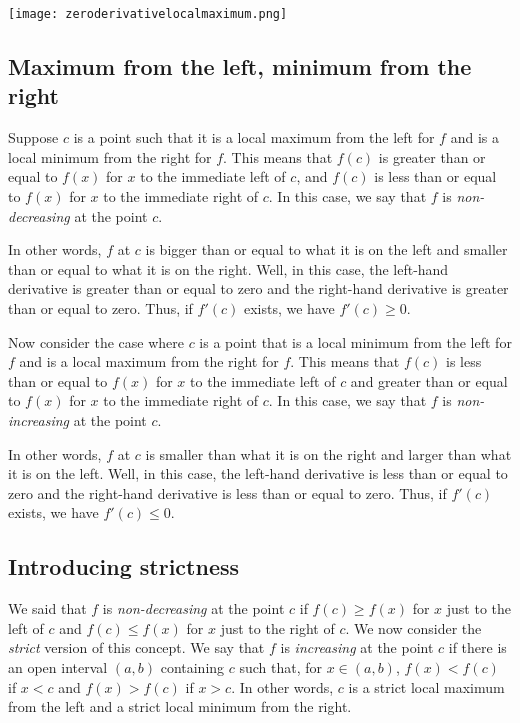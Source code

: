 \documentclass[10pt]{amsart}
\begin{document}
\texttt{[image: zeroderivativelocalmaximum.png]}

\subsection{Maximum from the left, minimum from the right}

Suppose $c$ is a point such that it is a local maximum from the left
for $f$ and is a local minimum from the right for $f$. This means that
$f(c)$ is greater than or equal to $f(x)$ for $x$ to the immediate
left of $c$, and $f(c)$ is less than or equal to $f(x)$ for $x$ to the
immediate right of $c$. In this case, we say that $f$ is {\em
non-decreasing} at the point $c$. 

In other words, $f$ at $c$ is bigger than or equal to what it is on
the left and smaller than or equal to what it is on the right. Well,
in this case, the left-hand derivative is greater than or equal to
zero and the right-hand derivative is greater than or equal to
zero. Thus, if $f'(c)$ exists, we have $f'(c) \ge 0$.

Now consider the case where $c$ is a point that is a local minimum
from the left for $f$ and is a local maximum from the right for
$f$. This means that $f(c)$ is less than or equal to $f(x)$ for $x$ to
the immediate left of $c$ and greater than or equal to $f(x)$ for $x$
to the immediate right of $c$. In this case, we say that $f$ is {\em
non-increasing} at the point $c$.

In other words, $f$ at $c$ is smaller than what it is on the right
and larger than what it is on the left. Well, in this case, the
left-hand derivative is less than or equal to zero and the right-hand
derivative is less than or equal to zero. Thus, if $f'(c)$ exists, we
have $f'(c) \le 0$.

\subsection{Introducing strictness}

We said that $f$ is {\em non-decreasing} at the point $c$ if $f(c) \ge
f(x)$ for $x$ just to the left of $c$ and $f(c) \le f(x)$ for $x$ just
to the right of $c$. We now consider the {\em strict} version of this
concept. We say that $f$ is {\em increasing} at the point $c$ if there
is an open interval $(a,b)$ containing $c$ such that, for $x \in
(a,b)$, $f(x) < f(c)$ if $x < c$ and $f(x) > f(c)$ if $x > c$. In
other words, $c$ is a strict local maximum from the left and a strict
local minimum from the right.
\end{document}
